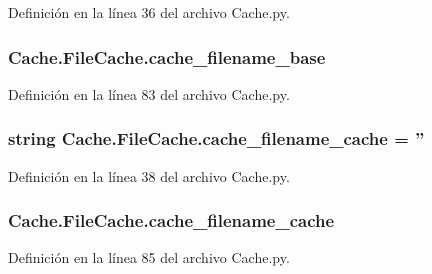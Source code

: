 Definición en la línea 36 del archivo Cache.\-py.

\hypertarget{class_cache_1_1_file_cache_ad4c782bcbd654eff2aea4c3b76815723}{
\subsubsection[{cache\-\_\-filename\-\_\-base}]{\setlength{\rightskip}{0pt plus 5cm}Cache.\-File\-Cache.\-cache\-\_\-filename\-\_\-base}}\label{class_cache_1_1_file_cache_ad4c782bcbd654eff2aea4c3b76815723}


Definición en la línea 83 del archivo Cache.\-py.

\hypertarget{class_cache_1_1_file_cache_abf7b20e99585e8ff1fd1c205eb02c2b3}{
\subsubsection[{cache\-\_\-filename\-\_\-cache}]{\setlength{\rightskip}{0pt plus 5cm}string Cache.\-File\-Cache.\-cache\-\_\-filename\-\_\-cache = ''\hspace{0.3cm}{\ttfamily [static]}}}\label{class_cache_1_1_file_cache_abf7b20e99585e8ff1fd1c205eb02c2b3}


Definición en la línea 38 del archivo Cache.\-py.

\hypertarget{class_cache_1_1_file_cache_af64994359a6b953e12a1f3352cbf057a}{
\subsubsection[{cache\-\_\-filename\-\_\-cache}]{\setlength{\rightskip}{0pt plus 5cm}Cache.\-File\-Cache.\-cache\-\_\-filename\-\_\-cache}}\label{class_cache_1_1_file_cache_af64994359a6b953e12a1f3352cbf057a}


Definición en la línea 85 del archivo Cache.\-py.

